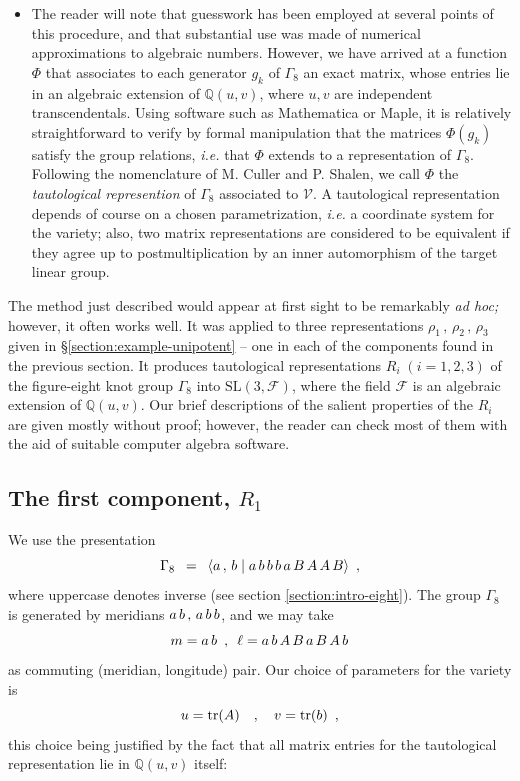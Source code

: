 \begin{itemize}
\item[\bf (iv)]  The reader will note that guesswork has been employed at several
points of this procedure, and that substantial use was made of numerical approximations
to algebraic numbers.  However, we have arrived at a function $\Phi$ that associates to
each generator $g_k$ of $\Gamma_8$ an exact matrix, whose entries lie in an algebraic extension
of $\mathbb Q(u,v)$, where $u,v$ are independent transcendentals.  Using software
such as Mathematica or Maple, it is relatively straightforward to verify by formal
manipulation that the matrices $\Phi(g_k)$ satisfy the group relations, {\it i.e.} that
$\Phi$ extends to a representation of $\Gamma_8$.  Following the nomenclature of M. Culler and
P. Shalen, we call $\Phi$ the {\it tautological represention} of $\Gamma_8$ associated to $\mathcal{V}$.
A tautological representation depends of course on a chosen parametrization, {\it i.e.}
a coordinate system for the variety; also, two matrix representations are considered
to be equivalent if they agree up to postmultiplication by an inner automorphism of
the target linear group.
\end{itemize}

The method just described would appear at first sight to be remarkably {\it ad hoc;}\/
however, it often works well.  It was applied to three representations
$\rho_1 \,,\, \rho_2 \,,\, \rho_3$ given in \S \ref{section:example-unipotent} -- one in each of the components found in the previous section. It produces tautological
representations $R_i \; (i=1,2,3)$ of the figure-eight knot group
$\Gamma_8$ into $\mathrm{SL(3,\mathcal{F})}$, where the field $\mathcal{F}$ is an
algebraic extension of $\mathbb Q(u,v)$.  Our brief descriptions of the salient
properties of the $R_i$ are given mostly without proof; however, the reader can
check most of them with the aid of suitable computer algebra software.
\vvv\noind

\subsection{The first component, $R_1$}  \label{ss:R1}
We use the presentation
\[ \Gamma_8 \hspace{.5em}=\hspace{.5em} \langle a \,,\, b \;|\; a\,b\,b\,b\,a\,B\,A\,A\,B \rangle \hspace{.5em},\]
where uppercase denotes inverse (see section \ref{section:intro-eight}). The group $\Gamma_8$ is generated by meridians $a\,b \,,\, a\,b\,b$,
and we may take
\[ m = a\,b \hspace{.5em},\hspace{.5em} \ell = a\,b\,A\,B\,a\,B\,A\,b \]
as commuting (meridian, longitude) pair.
Our choice of parameters for the variety is
\[ u = \mathrm{tr}(A) \quad,\quad v = \mathrm{tr}(b) \hspace{.5em},\]
this choice being justified by the fact that
all matrix entries for the tautological representation lie in $\mathbb Q(u,v)$ itself:


